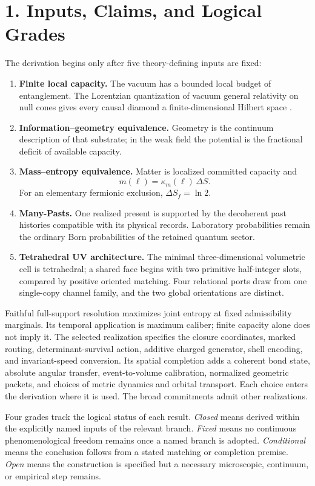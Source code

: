 \documentclass[11pt]{article}
\begin{document}
\section{1. Inputs, Claims, and Logical Grades}

The derivation begins only after five theory-defining inputs are fixed:
\begin{enumerate}
\item \textbf{Finite local capacity.} The vacuum has a bounded local budget of entanglement. The Lorentzian quantization of vacuum general relativity on null cones gives every causal diamond a finite-dimensional Hilbert space \citep{Chandrasekaran2026Null}.
\item \textbf{Information--geometry equivalence.} Geometry is the continuum description of that substrate; in the weak field the potential is the fractional deficit of available capacity.
\item \textbf{Mass--entropy equivalence.} Matter is localized committed capacity and
\[
 m(\ell)=\kappa_m(\ell)\,\Delta S.
\]
For an elementary fermionic exclusion, $\Delta S_f=\ln2$.
\item \textbf{Many-Pasts.} One realized present is supported by the decoherent past histories compatible with its physical records. Laboratory probabilities remain the ordinary Born probabilities of the retained quantum sector.
\item \textbf{Tetrahedral UV architecture.} The minimal three-dimensional volumetric cell is tetrahedral; a shared face begins with two primitive half-integer slots, compared by positive oriented matching. Four relational ports draw from one single-copy channel family, and the two global orientations are distinct.
\end{enumerate}

Faithful full-support resolution maximizes joint entropy at fixed admissibility marginals. Its temporal application is maximum caliber; finite capacity alone does not imply it. The selected realization specifies the closure coordinates, marked routing, determinant-survival action, additive charged generator, shell encoding, and invariant-speed conversion. Its spatial completion adds a coherent bond state, absolute angular transfer, event-to-volume calibration, normalized geometric packets, and choices of metric dynamics and orbital transport. Each choice enters the derivation where it is used. The broad commitments admit other realizations.

Four grades track the logical status of each result. \emph{Closed} means derived within the explicitly named inputs of the relevant branch. \emph{Fixed} means no continuous phenomenological freedom remains once a named branch is adopted. \emph{Conditional} means the conclusion follows from a stated matching or completion premise. \emph{Open} means the construction is specified but a necessary microscopic, continuum, or empirical step remains.
\end{document}
